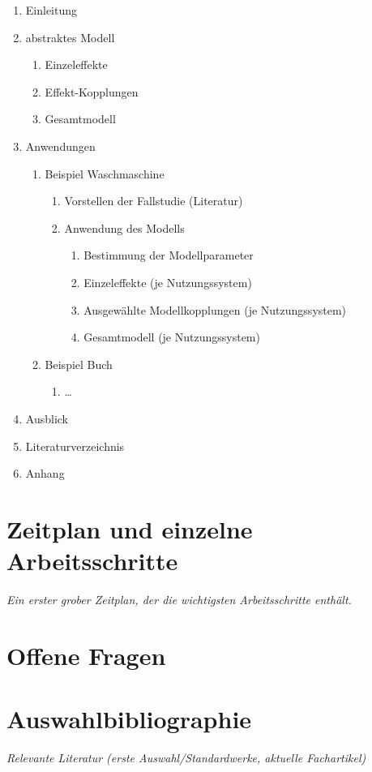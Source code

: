 \documentclass[11pt, titlepage=true]{scrartcl} %
\newcommand{\was}[1]{\small\textit{#1}}
\begin{document}
\begin{enumerate}

\item Einleitung

\item abstraktes Modell
	\begin{enumerate}
		\item Einzeleffekte
		\item Effekt-Kopplungen
		\item Gesamtmodell
	\end{enumerate}

\item Anwendungen
	\begin{enumerate}
		\item Beispiel Waschmaschine
		\begin{enumerate}
			\item Vorstellen der Fallstudie (Literatur)
			\item Anwendung des Modells
			\begin{enumerate}
				\item Bestimmung der Modellparameter
				\item Einzeleffekte (je Nutzungssystem)
				\item Ausgewählte Modellkopplungen (je Nutzungssystem)
				\item Gesamtmodell (je Nutzungssystem)
			\end{enumerate}
		\end{enumerate}
		\item Beispiel Buch
		\begin{enumerate}
		\item \dots
		\end{enumerate}
	\end{enumerate}

\item Ausblick
\item Literaturverzeichnis
\item Anhang
\end{enumerate}

\section{Zeitplan und einzelne Arbeitsschritte}
\was{Ein erster grober Zeitplan, der die wichtigsten Arbeitsschritte enthält.}

\section{Offene Fragen}

\section{Auswahlbibliographie}
\was{Relevante Literatur (erste Auswahl/Standardwerke, aktuelle Fachartikel)}

\end{document}
